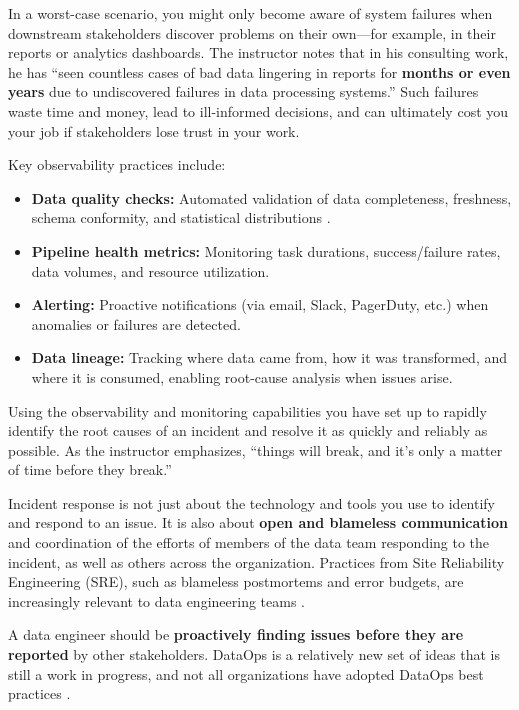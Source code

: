 \documentclass{article}
\begin{document}
\begin{description}
    In a worst-case scenario, you might only become aware of system failures when downstream stakeholders discover problems on their own---for example, in their reports or analytics dashboards. The instructor notes that in his consulting work, he has ``seen countless cases of bad data lingering in reports for \textbf{months or even years} due to undiscovered failures in data processing systems.'' Such failures waste time and money, lead to ill-informed decisions, and can ultimately cost you your job if stakeholders lose trust in your work.

    Key observability practices include:
    \begin{itemize}
        \item \textbf{Data quality checks:} Automated validation of data completeness, freshness, schema conformity, and statistical distributions \cite{breck2019data}.
        \item \textbf{Pipeline health metrics:} Monitoring task durations, success/failure rates, data volumes, and resource utilization.
        \item \textbf{Alerting:} Proactive notifications (via email, Slack, PagerDuty, etc.) when anomalies or failures are detected.
        \item \textbf{Data lineage:} Tracking where data came from, how it was transformed, and where it is consumed, enabling root-cause analysis when issues arise.
    \end{itemize}

    \item[Pillar 3: Incident Response] Using the observability and monitoring capabilities you have set up to rapidly identify the root causes of an incident and resolve it as quickly and reliably as possible. As the instructor emphasizes, ``things will break, and it's only a matter of time before they break.''

    Incident response is not just about the technology and tools you use to identify and respond to an issue. It is also about \textbf{open and blameless communication} and coordination of the efforts of members of the data team responding to the incident, as well as others across the organization. Practices from Site Reliability Engineering (SRE), such as blameless postmortems and error budgets, are increasingly relevant to data engineering teams \cite{beyer2016sre}.

    A data engineer should be \textbf{proactively finding issues before they are reported} by other stakeholders. DataOps is a relatively new set of ideas that is still a work in progress, and not all organizations have adopted DataOps best practices \cite{reis2022fundamentals}.
\end{description}
\end{document}
